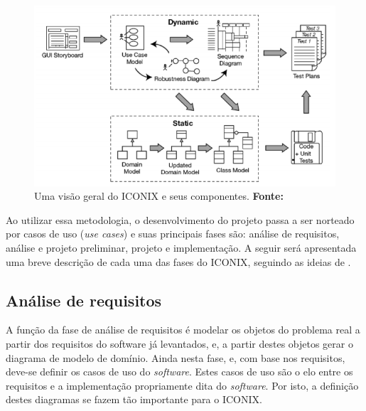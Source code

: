 \begin{figure}[h!]
	\centerline{\includegraphics[scale=0.95]{./imagens/visao_geral_iconix.png}}
	\caption[Uma visão geral do ICONIX e seus componentes.]
	{Uma visão geral do ICONIX e seus componentes. \textbf{Fonte:} }
	\label{fig:visao_geral_iconix_componentes}
\end{figure}

\newpage %

\par Ao utilizar essa metodologia, o desenvolvimento do projeto passa a ser norteado por casos de uso (\textit{use cases}) e suas principais fases são: análise de requisitos, análise e projeto preliminar, projeto e implementação. A seguir será apresentada uma breve descrição de cada uma das fases do ICONIX, seguindo as ideias de .

\subsection{Análise de requisitos}

A função da fase de análise de requisitos é modelar os objetos do problema real a partir dos requisitos do software já levantados, e, a partir destes objetos gerar o diagrama de modelo de domínio. Ainda nesta fase, e, com base nos requisitos, deve-se definir os casos de uso do \textit{software}. Estes casos de uso são o elo entre os requisitos e a implementação propriamente dita do \textit{software}. Por isto, a definição destes diagramas se fazem tão importante para o ICONIX. 



